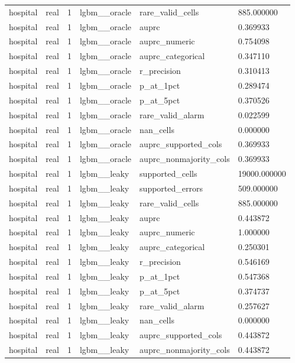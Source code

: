 \begin{tabular}{llllll}
hospital & real & 1 & lgbm\_\_oracle & rare\_valid\_cells & 885.000000 \\
hospital & real & 1 & lgbm\_\_oracle & auprc & 0.369933 \\
hospital & real & 1 & lgbm\_\_oracle & auprc\_numeric & 0.754098 \\
hospital & real & 1 & lgbm\_\_oracle & auprc\_categorical & 0.347110 \\
hospital & real & 1 & lgbm\_\_oracle & r\_precision & 0.310413 \\
hospital & real & 1 & lgbm\_\_oracle & p\_at\_1pct & 0.289474 \\
hospital & real & 1 & lgbm\_\_oracle & p\_at\_5pct & 0.370526 \\
hospital & real & 1 & lgbm\_\_oracle & rare\_valid\_alarm & 0.022599 \\
hospital & real & 1 & lgbm\_\_oracle & nan\_cells & 0.000000 \\
hospital & real & 1 & lgbm\_\_oracle & auprc\_supported\_cols & 0.369933 \\
hospital & real & 1 & lgbm\_\_oracle & auprc\_nonmajority\_cols & 0.369933 \\
hospital & real & 1 & lgbm\_\_leaky & supported\_cells & 19000.000000 \\
hospital & real & 1 & lgbm\_\_leaky & supported\_errors & 509.000000 \\
hospital & real & 1 & lgbm\_\_leaky & rare\_valid\_cells & 885.000000 \\
hospital & real & 1 & lgbm\_\_leaky & auprc & 0.443872 \\
hospital & real & 1 & lgbm\_\_leaky & auprc\_numeric & 1.000000 \\
hospital & real & 1 & lgbm\_\_leaky & auprc\_categorical & 0.250301 \\
hospital & real & 1 & lgbm\_\_leaky & r\_precision & 0.546169 \\
hospital & real & 1 & lgbm\_\_leaky & p\_at\_1pct & 0.547368 \\
hospital & real & 1 & lgbm\_\_leaky & p\_at\_5pct & 0.374737 \\
hospital & real & 1 & lgbm\_\_leaky & rare\_valid\_alarm & 0.257627 \\
hospital & real & 1 & lgbm\_\_leaky & nan\_cells & 0.000000 \\
hospital & real & 1 & lgbm\_\_leaky & auprc\_supported\_cols & 0.443872 \\
hospital & real & 1 & lgbm\_\_leaky & auprc\_nonmajority\_cols & 0.443872 \\

\end{tabular}
